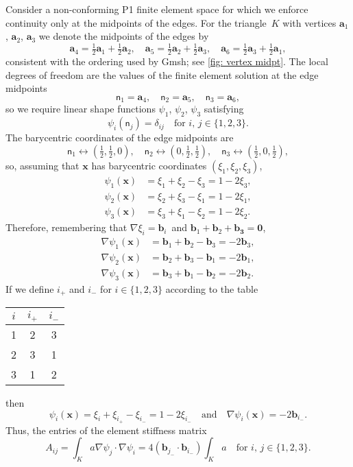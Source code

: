 \documentclass[a4paper,12pt]{article}
\newcommand{\bs}[1]{\boldsymbol{#1}}
\begin{document}
Consider a non-conforming P1 finite element space for which we enforce
continuity only at the midpoints of the edges.  For the triangle~$K$ with
vertices $\bs{a}_1$, $\bs{a}_2$, $\bs{a}_3$ we denote the midpoints of the edges
by
\[
\bs{a}_4=\tfrac12\bs{a}_1+\tfrac12\bs{a}_2,\quad
\bs{a}_5=\tfrac12\bs{a}_2+\tfrac12\bs{a}_3,\quad
\bs{a}_6=\tfrac12\bs{a}_3+\tfrac12\bs{a}_1,
\]
consistent with the ordering used by Gmsh; see \cref{fig: vertex midpt}.  The
local degrees of freedom are the values of the finite element solution at the
edge midpoints
\[
\mathsf{n}_1=\bs{a}_4,\quad\mathsf{n}_2=\bs{a}_5,\quad\mathsf{n}_3=\bs{a}_6,
\]
so we require linear shape functions $\psi_1$, $\psi_2$, $\psi_3$ satisfying
\[
\psi_i(\mathsf{n}_j)=\delta_{ij}\quad\text{for $i$, $j\in\{1,2,3\}$.}
\]
The barycentric coordinates of the edge midpoints are
\[
\mathsf{n}_1\leftrightarrow(\tfrac12,\tfrac12,0),\quad
\mathsf{n}_2\leftrightarrow(0,\tfrac12,\tfrac12),\quad
\mathsf{n}_3\leftrightarrow(\tfrac12,0,\tfrac12),
\]
so, assuming that $\bs{x}$ has barycentric coordinates $(\xi_1,\xi_2,\xi_3)$,
\begin{equation}\label{eq: psi_i nonconforming}
\begin{aligned}
\psi_1(\bs{x})&=\xi_1+\xi_2-\xi_3=1-2\xi_3,\\
\psi_2(\bs{x})&=\xi_2+\xi_3-\xi_1=1-2\xi_1,\\
\psi_3(\bs{x})&=\xi_3+\xi_1-\xi_2=1-2\xi_2.
\end{aligned}
\end{equation}
Therefore, remembering that $\nabla\xi_i=\bs{b}_i$~and
$\bs{b}_1+\bs{b}_2+\bs{b_3}=\bs{0}$,
\begin{align*}
\nabla\psi_1(\bs{x})&=\bs{b}_1+\bs{b}_2-\bs{b}_3=-2\bs{b}_3,\\
\nabla\psi_2(\bs{x})&=\bs{b}_2+\bs{b}_3-\bs{b}_1=-2\bs{b}_1,\\
\nabla\psi_3(\bs{x})&=\bs{b}_3+\bs{b}_1-\bs{b}_2=-2\bs{b}_2.
\end{align*}
If we define $i_+$ and $i_-$ for $i\in\{1,2,3\}$ according to the table
\begin{center}
\renewcommand{\arraystretch}{1.2}
\begin{tabular}{c|c|c}
$i$&$i_+$&$i_-$\\
\hline
1&2&3\\
2&3&1\\
3&1&2
\end{tabular}
\end{center}
then
\begin{equation}\label{eq: grad psi_i}
\psi_i(\bs{x})=\xi_i+\xi_{i_+}-\xi_{i_-}=1-2\xi_{i_-}
\quad\text{and}\quad
\nabla\psi_i(\bs{x})=-2\bs{b}_{i_-}.
\end{equation}
Thus, the entries of the element stiffness matrix
\[
A_{ij}=\int_Ka\nabla\psi_j\cdot\nabla\psi_i
    =4(\bs{b}_{j_-}\cdot\bs{b}_{i_-})\int_Ka
\quad\text{for $i$, $j\in\{1,2,3\}$.}
\]
\end{document}
